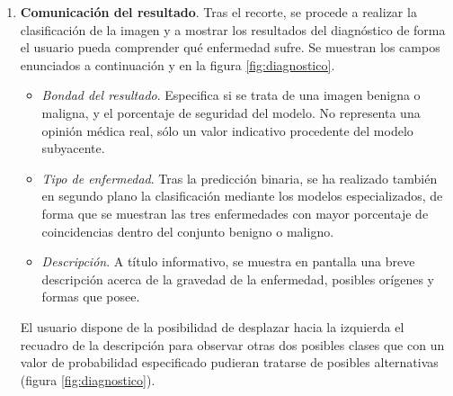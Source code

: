 \begin{enumerate}
 	\item \textbf {Comunicación del resultado}. Tras el recorte, se procede a realizar la clasificación de la imagen y a mostrar los resultados del diagnóstico de forma el usuario pueda comprender qué enfermedad sufre. Se muestran los campos enunciados a continuación y en la figura \ref{fig:diagnostico}.
 	\begin{itemize}
 		\item \textit{Bondad del resultado}. Especifica si se trata de una imagen benigna o maligna, y el porcentaje de seguridad del modelo. No representa una opinión médica real, sólo un valor indicativo procedente del modelo subyacente.
 		\item \textit{Tipo de enfermedad}. Tras la predicción binaria, se ha realizado también en segundo plano la clasificación mediante los modelos especializados, de forma que se muestran las tres enfermedades con mayor porcentaje de coincidencias dentro del conjunto benigno o maligno.
 		\item \textit{Descripción}. A título informativo, se muestra en pantalla una breve descripción acerca de la gravedad de la enfermedad, posibles orígenes y formas que posee.
 	\end{itemize}
 	
 	El usuario dispone de la posibilidad de desplazar hacia la izquierda el recuadro de la descripción para observar otras dos posibles clases que con un valor de probabilidad especificado pudieran tratarse de posibles alternativas (figura \ref{fig:diagnostico}).
 \end{enumerate}
 
